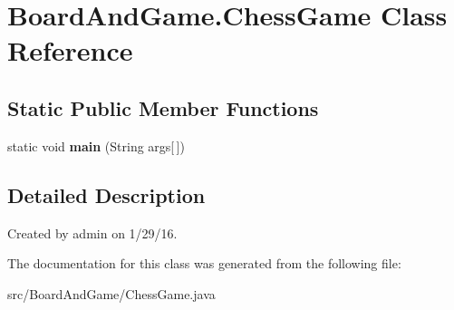 \hypertarget{class_board_and_game_1_1_chess_game}{}\section{Board\+And\+Game.\+Chess\+Game Class Reference}
\label{class_board_and_game_1_1_chess_game}
\subsection*{Static Public Member Functions}
\begin{DoxyCompactItemize}
\item 
static void {\bfseries main} (String args\mbox{[}$\,$\mbox{]})\hypertarget{class_board_and_game_1_1_chess_game_a8e2766d420f9def40af93816748397d8}{}\label{class_board_and_game_1_1_chess_game_a8e2766d420f9def40af93816748397d8}

\end{DoxyCompactItemize}


\subsection{Detailed Description}
Created by admin on 1/29/16. 

The documentation for this class was generated from the following file\+:\begin{DoxyCompactItemize}
\item 
src/\+Board\+And\+Game/Chess\+Game.\+java\end{DoxyCompactItemize}
